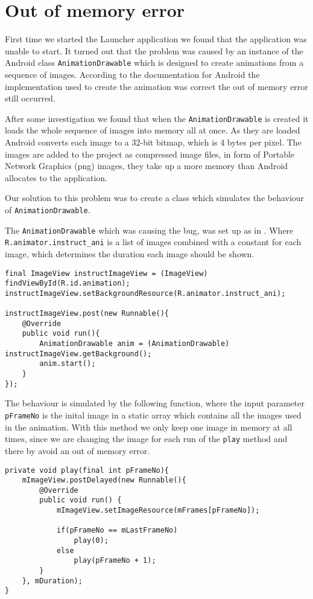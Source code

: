 \section{Out of memory error}
First time we started the Launcher application we found that the application was unable to start.
It turned out that the problem was caused by an instance of the Android class \lstinline{AnimationDrawable} which is designed to create animations from a sequence of images.
According to the documentation for Android the implementation used to create the animation was correct the out of memory error still occurred.

After some investigation we found that when the \lstinline{AnimationDrawable} is created it loads the whole sequence of images into memory all at once.
As they are loaded Android converts each image to a 32-bit bitmap, which is 4 bytes per pixel.
The images are added to the project as compressed image files, in form of Portable Network Graphics (png) images, they take up a more memory than Android allocates to the application.

Our solution to this problem was to create a class which simulates the behaviour of \lstinline{AnimationDrawable}.

The \lstinline{AnimationDrawable} which was causing the bug, was set up as in . Where \lstinline{R.animator.instruct_ani} is a list of images combined with a constant for each image, which determines the duration each image should be shown.
\begin{lstlisting}
final ImageView instructImageView = (ImageView) findViewById(R.id.animation);
instructImageView.setBackgroundResource(R.animator.instruct_ani);

instructImageView.post(new Runnable(){
    @Override
    public void run(){
        AnimationDrawable anim = (AnimationDrawable) instructImageView.getBackground();
        anim.start();
    }
});
\end{lstlisting}

The behaviour is simulated by the following function, where the input parameter \lstinline{pFrameNo} is the inital image in a static array which contains all the images used in the animation. With this method we only keep one image in memory at all times, since we are changing the image for each run of the \lstinline{play} method and there by avoid an out of memory error.
\begin{lstlisting}
private void play(final int pFrameNo){
    mImageView.postDelayed(new Runnable(){
        @Override
        public void run() {                    
            mImageView.setImageResource(mFrames[pFrameNo]);

            if(pFrameNo == mLastFrameNo)
                play(0);
            else
                play(pFrameNo + 1);
        }
    }, mDuration);
}        
\end{lstlisting}